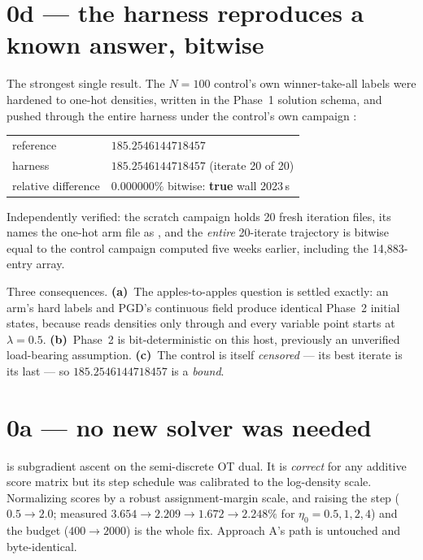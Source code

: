 \documentclass[11pt,a4paper]{article}
\begin{document}
\section{0d --- the harness reproduces a known answer, bitwise}

The strongest single result. The \(N{=}100\) control's own winner-take-all
labels were hardened to one-hot densities, written in the Phase~1 solution
schema, and pushed through the entire harness under the control's own campaign
:

\begin{center}\small
\begin{tabular}{@{}ll@{}}
\toprule
reference & \(185.2546144718457\) \\
harness & \(185.2546144718457\) \quad (iterate 20 of 20) \\
relative difference & \(0.000000\%\) \quad bitwise: \textbf{true} \quad wall 2023\,s \\
\bottomrule
\end{tabular}
\end{center}

Independently verified: the scratch campaign holds 20 fresh iteration files, its
 names the one-hot arm file as , and
the \emph{entire} 20-iterate trajectory is bitwise equal to the control campaign
computed five weeks earlier, including the 14{,}883-entry
 array.

Three consequences. \textbf{(a)}~The apples-to-apples question is settled
exactly: an arm's hard labels and PGD's continuous field produce identical
Phase~2 initial states, because  reads densities only
through  and every variable point starts at \(\lambda{=}0.5\).
\textbf{(b)}~Phase~2 is bit-deterministic on this host, previously an unverified
load-bearing assumption. \textbf{(c)}~The control is itself \emph{censored} ---
its best iterate is its last --- so \(185.2546144718457\) is a \emph{bound}.

\section{0a --- no new solver was needed}
\label{sec:0a}

 is subgradient ascent on the semi-discrete OT dual.
It is \emph{correct} for any additive score matrix but its step schedule was
calibrated to the log-density scale. Normalizing scores by a robust
assignment-margin scale, and raising the step ( \(0.5 \to
2.0\); measured \(3.654 \to 2.209 \to \mathbf{1.672} \to 2.248\%\) for
\(\eta_0 = 0.5, 1, 2, 4\)) and the budget (\(400 \to 2000\)) is the whole fix.
Approach A's path is untouched and byte-identical.
\end{document}
